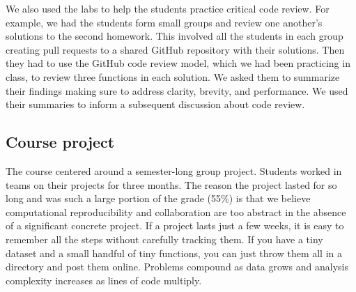 We also used the labs to help the students practice critical code review.
For example, we had the students form small groups and review one another's
solutions to the second homework.
This involved all the students in each group creating pull requests to a
shared GitHub repository with their solutions.
Then they had to use the GitHub code review model, which we had been practicing
in class, to review three functions in each solution.
We asked them to summarize their findings making sure to address
clarity, brevity, and performance.
We used their summaries to inform a subsequent discussion about code review.

\subsection{Course project}\label{project}

The course centered around a semester-long group project.
Students worked in teams on their projects for three months.
The reason the project lasted for so long and was such a large portion of the grade (55\%)
is that we believe computational reproducibility and collaboration
are too abstract in the absence of a significant concrete project.
If a project lasts just a few weeks, it is easy to remember all the steps
without carefully tracking them.
If you have a tiny dataset and a small handful of tiny functions, you can just
throw them all in a directory and post them online.
Problems compound as data grows and analysis complexity increases as lines of
code multiply.


